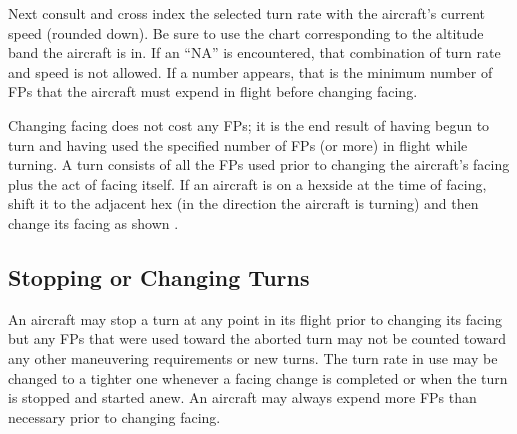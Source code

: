 Next consult  and cross index the selected turn rate with the aircraft's current speed (rounded down). 
Be sure to use the chart corresponding to the altitude band the aircraft is in. If an “NA” is encountered, that combination of turn rate and speed is not allowed. If a number appears, that is the minimum number of FPs that the aircraft must expend in flight before changing facing. 


Changing facing does not cost any FPs; it is the end result of having begun to turn and having used the specified number of FPs (or more) in flight while turning. A turn consists of all the FPs used prior to changing the aircraft's facing plus the act of facing itself. If an aircraft is on a hexside at the time of facing, shift it to the adjacent hex (in the direction the aircraft is turning) and then change its facing as shown .


\subsection{Stopping or Changing Turns}
An aircraft may stop a turn at any point in its flight prior to changing its facing but any FPs that were used toward the aborted turn may not be counted toward any other maneuvering requirements or new turns. The turn rate in use may be changed to a tighter one whenever a facing change is completed or when the turn is stopped and started anew. An aircraft may always expend more FPs than necessary prior to changing facing.

